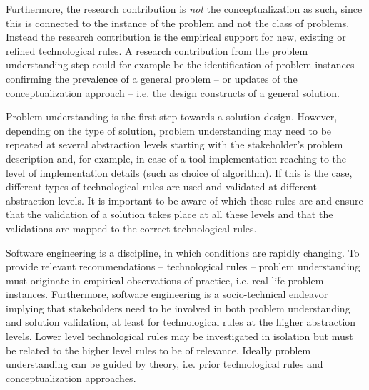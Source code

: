 \documentclass[graybox]{svmult}
\begin{document}
Furthermore, the research contribution is \emph{not} the conceptualization as such, since this is connected to the instance of the problem and not the class of problems. Instead the research contribution is the empirical support for new, existing or refined technological rules. A research contribution from the problem understanding step could for example be the identification of problem instances -- confirming the prevalence of a general problem -- or updates of the conceptualization approach -- i.e. the design constructs of a general solution.


Problem understanding is the first step towards a solution design. However, depending on the type of solution, problem understanding may need to be repeated at several abstraction levels starting with the stakeholder's problem description and, for example, in case of a tool implementation reaching to the level of implementation details (such as  choice of algorithm). If this is the case, different types of technological rules are used and validated at different abstraction levels. It is important to be aware of which these rules are and ensure that the validation of a solution takes place at all these levels and that the validations are mapped to the correct technological rules. 

Software engineering is a discipline, in which conditions are rapidly changing. To provide relevant recommendations -- technological rules -- problem understanding must originate in empirical observations of practice, i.e. real life problem instances. Furthermore, software engineering is a socio-technical endeavor implying that stakeholders need to be involved in both problem understanding and solution validation, at least for technological rules at the higher abstraction levels. Lower level technological rules may be investigated in isolation but must be related to the higher level rules to be of relevance. 
Ideally problem understanding can be guided by theory, i.e. prior technological rules and conceptualization approaches. 



\end{document}
